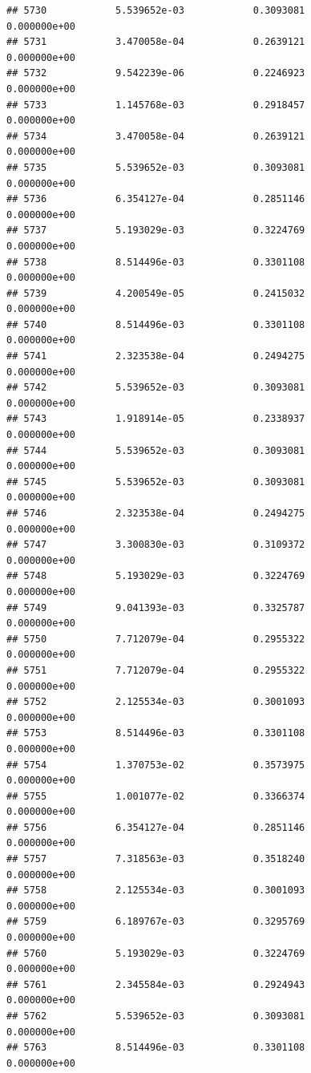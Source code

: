 \documentclass[
]{article}
\begin{document}
\begin{verbatim}
## 5730            5.539652e-03            0.3093081            0.000000e+00
## 5731            3.470058e-04            0.2639121            0.000000e+00
## 5732            9.542239e-06            0.2246923            0.000000e+00
## 5733            1.145768e-03            0.2918457            0.000000e+00
## 5734            3.470058e-04            0.2639121            0.000000e+00
## 5735            5.539652e-03            0.3093081            0.000000e+00
## 5736            6.354127e-04            0.2851146            0.000000e+00
## 5737            5.193029e-03            0.3224769            0.000000e+00
## 5738            8.514496e-03            0.3301108            0.000000e+00
## 5739            4.200549e-05            0.2415032            0.000000e+00
## 5740            8.514496e-03            0.3301108            0.000000e+00
## 5741            2.323538e-04            0.2494275            0.000000e+00
## 5742            5.539652e-03            0.3093081            0.000000e+00
## 5743            1.918914e-05            0.2338937            0.000000e+00
## 5744            5.539652e-03            0.3093081            0.000000e+00
## 5745            5.539652e-03            0.3093081            0.000000e+00
## 5746            2.323538e-04            0.2494275            0.000000e+00
## 5747            3.300830e-03            0.3109372            0.000000e+00
## 5748            5.193029e-03            0.3224769            0.000000e+00
## 5749            9.041393e-03            0.3325787            0.000000e+00
## 5750            7.712079e-04            0.2955322            0.000000e+00
## 5751            7.712079e-04            0.2955322            0.000000e+00
## 5752            2.125534e-03            0.3001093            0.000000e+00
## 5753            8.514496e-03            0.3301108            0.000000e+00
## 5754            1.370753e-02            0.3573975            0.000000e+00
## 5755            1.001077e-02            0.3366374            0.000000e+00
## 5756            6.354127e-04            0.2851146            0.000000e+00
## 5757            7.318563e-03            0.3518240            0.000000e+00
## 5758            2.125534e-03            0.3001093            0.000000e+00
## 5759            6.189767e-03            0.3295769            0.000000e+00
## 5760            5.193029e-03            0.3224769            0.000000e+00
## 5761            2.345584e-03            0.2924943            0.000000e+00
## 5762            5.539652e-03            0.3093081            0.000000e+00
## 5763            8.514496e-03            0.3301108            0.000000e+00

\end{verbatim}
\end{document}
